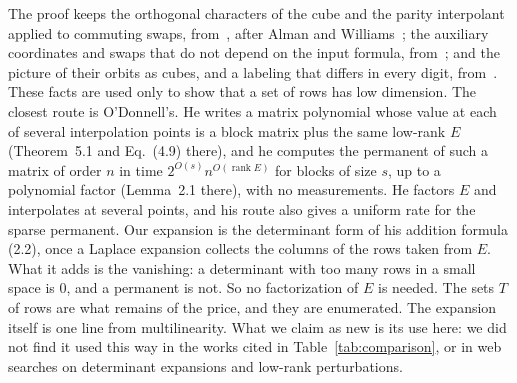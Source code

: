 \documentclass[11pt]{article}
\numberwithin{equation}{section}
\theoremstyle{remark}
\begin{document}
\begin{table}[ht]
\centering
\small
{}
\caption{Where the proofs differ. For Appendix~D of~\cite{OAI26} we read the overview and the headings.}\label{tab:comparison}
\end{table}

The proof keeps the orthogonal characters of the cube and the parity interpolant applied to commuting swaps, from~\cite{OAI26}, after Alman and Williams~\cite{AW15,AW17}; the auxiliary coordinates and swaps that do not depend on the input formula, from~\cite{OAI26,Kin26}; and the picture of their orbits as cubes, and a labeling that differs in every digit, from~\cite{OD26}. These facts are used only to show that a set of rows has low dimension. The closest route is O'Donnell's. He writes a matrix polynomial whose value at each of several interpolation points is a block matrix plus the same low-rank $E$ (Theorem~5.1 and Eq.~(4.9) there), and he computes the permanent of such a matrix of order $n$ in time $2^{O(s)}n^{O(\operatorname{rank}E)}$ for blocks of size $s$, up to a polynomial factor (Lemma~2.1 there), with no measurements. He factors $E$ and interpolates at several points, and his route also gives a uniform rate for the sparse permanent. Our expansion is the determinant form of his addition formula (2.2), once a Laplace expansion collects the columns of the rows taken from $E$. What it adds is the vanishing: a determinant with too many rows in a small space is $0$, and a permanent is not. So no factorization of $E$ is needed. The sets $T$ of rows are what remains of the price, and they are enumerated. The expansion itself is one line from multilinearity. What we claim as new is its use here: we did not find it used this way in the works cited in Table~\ref{tab:comparison}, or in web searches on determinant expansions and low-rank perturbations.
\end{document}
